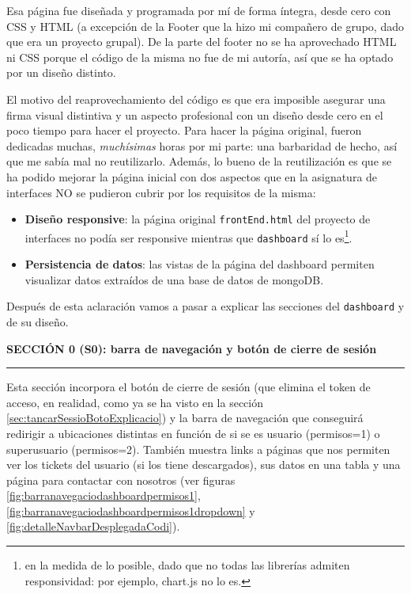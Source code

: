 \documentclass[a4paper,12pt]{report}
\begin{document}
	Esa página fue diseñada y programada por mí de forma íntegra, desde cero con CSS y HTML (a excepción de la Footer que la hizo mi compañero de grupo, dado que era un proyecto grupal). De la parte del footer no se ha aprovechado HTML ni CSS porque el código de la misma no fue de mi autoría, así que se ha optado por un diseño distinto.
	
	El motivo del reaprovechamiento del código es que era imposible asegurar una firma visual distintiva y un aspecto profesional con un diseño desde cero en el poco tiempo para hacer el proyecto. Para hacer la página original, fueron dedicadas muchas, \textit{muchísimas} horas por mi parte: una barbaridad de hecho, así que me sabía mal no reutilizarlo. Además, lo bueno de la reutilización es que se ha podido mejorar la página inicial con dos aspectos que en la asignatura de interfaces NO se pudieron cubrir por los requisitos de la misma:
	
	\vspace{-.8em}
	\begin{itemize}
		\setlength{\itemsep}{-.2em}
		\item \textbf{Diseño responsive}: la página original \texttt{frontEnd.html} del proyecto de interfaces no podía ser responsive mientras que \texttt{dashboard} sí lo es\footnote{en la medida de lo posible, dado que no todas las librerías admiten responsividad: por ejemplo, chart.js no lo es.}.
		\item \textbf{Persistencia de datos}: las vistas de la página del dashboard permiten visualizar datos extraídos de una base de datos de mongoDB.
	\end{itemize}
	
	\noindent Después de esta aclaración vamos a pasar a explicar las secciones del \texttt{dashboard} y de su diseño.
	
	
	
	\noindent \textbf{SECCIÓN 0 (S0): barra de navegación y botón de cierre de sesión}
	\hrule
	\vspace{.5em}
	
	Esta sección incorpora el botón de cierre de sesión (que elimina el token de acceso, en realidad, como ya se ha visto en la sección \ref{sec:tancarSessioBotoExplicacio}) y la barra de navegación que conseguirá redirigir a ubicaciones distintas en función de si se es usuario (permisos=1) o superusuario (permisos=2). También muestra links a páginas que nos permiten ver los tickets del usuario (si los tiene descargados), sus datos en una tabla y una página para contactar con nosotros (ver figuras \ref{fig:barranavegaciodashboardpermisos1}, \ref{fig:barranavegaciodashboardpermisos1dropdown} y \ref{fig:detalleNavbarDesplegadaCodi}).
	
\end{document}

